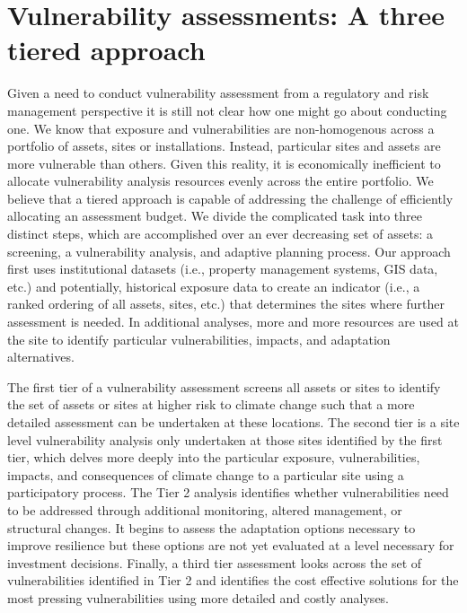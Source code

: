 \documentclass[10pt]{amsart}
\begin{document}
\section{Vulnerability assessments: A three tiered approach}
Given a need to conduct vulnerability assessment from a regulatory and risk management perspective it is still not clear how one might go about conducting one.
We know that exposure and vulnerabilities are non-homogenous across a portfolio of assets, sites or installations. 
Instead, particular sites and assets are more vulnerable than others.
Given this reality, it is economically inefficient to allocate vulnerability analysis resources evenly across the entire portfolio.
We believe that a tiered approach is capable of addressing the challenge of efficiently allocating an assessment budget.
We divide the complicated task into three distinct steps, which are accomplished over an ever decreasing set of assets: a screening, a vulnerability analysis, and adaptive planning process. 
Our approach first uses institutional datasets (i.e., property management systems, GIS data, etc.) and potentially, historical exposure data to create an indicator (i.e., a ranked ordering of all assets, sites, etc.) that determines the sites where further assessment is needed. 
In additional analyses, more and more resources are used at the site to identify particular vulnerabilities, impacts, and adaptation alternatives. 

The first tier of a vulnerability assessment screens all assets or sites to identify the set of assets or sites at higher risk to climate change such that a more detailed assessment can be undertaken at these locations.
The second tier is a site level vulnerability analysis only undertaken at those sites identified by the first tier, which delves more deeply into the particular exposure, vulnerabilities, impacts, and consequences of climate change to a particular site using a participatory process.
The Tier 2 analysis identifies whether vulnerabilities need to be addressed through additional monitoring, altered management, or structural changes.
It begins to assess the adaptation options necessary to improve resilience but these options are not yet evaluated at a level necessary for investment decisions.
Finally, a third tier assessment looks across the set of vulnerabilities identified in Tier 2 and identifies the cost effective solutions for the most pressing vulnerabilities using more detailed and costly analyses.
\end{document}
